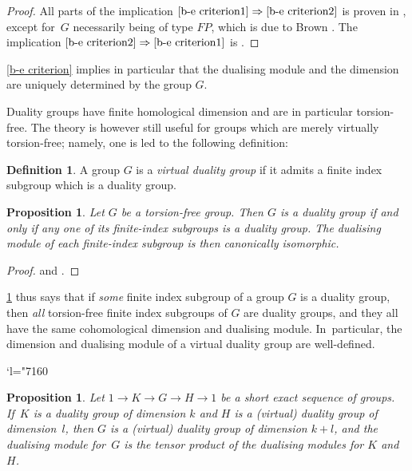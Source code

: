 \documentclass[JEP,XML,SOM,Unicode,NoFloatCountersInSection,published]{cedram}
\newcommand{\Changel}{\mathcode`l="7160}
\theoremstyle{plain}
\newtheorem{prop}[thm]{Proposition}
\theoremstyle{definition}
\newtheorem{defn}[thm]{Definition}
\begin{document}
\begin{proof}
All parts of the implication $\eqref{b-e criterion1}\Rightarrow\eqref{b-e criterion2}$ is proven in \cite[\S 1]{be}, except for~$G$ necessarily being of type $\mathit{FP}$, which is due to Brown \cite{brown-finiteness}. The implication $\eqref{b-e criterion2}\Rightarrow\eqref{b-e criterion1}$ is \cite[Th.\,4.5]{be}.
\end{proof}

\cref{b-e criterion} implies in particular that the dualising module and the dimension are uniquely determined by the group $G$.

Duality groups have finite homological dimension and are in particular torsion-free. The theory is however still useful for groups which are merely virtually torsion-free; namely, one is led to the following definition:

\begin{defn}
A group $G$ is a \emph{virtual duality group} if it admits a finite index subgroup which is a duality group.
\end{defn}

\begin{prop}\label{finite index}
Let $G$ be a torsion-free group. Then $G$ is a duality group if and only if any one of its finite-index subgroups is a duality group. The dualising module of each finite-index subgroup is then canonically isomorphic.
\end{prop}

\begin{proof}
\cite[Th.\,3.2]{be} and \cite[Th.\,3.3]{be}.
\end{proof}

\cref{finite index} thus says that if \emph{some} finite index subgroup of a group $G$ is a duality group, then \emph{all} torsion-free finite index subgroups of $G$ are duality groups, and they all have the same cohomological dimension and dualising module. In~particular, the dimension and dualising module of a virtual duality group are well-defined.

\Changel

\begin{prop}\label{prop:SES}
Let $1 \to K \to G \to H \to 1$ be a short exact sequence of groups. If~$K$ is a duality group of dimension $k$ and $H$ is a (virtual) duality group of dimension~$l$, then $G$ is a (virtual) duality group of dimension $k+l$, and the dualising module for~$G$ is the tensor product of the dualising modules for $K$ and $H$.
\end{prop}
\end{document}
